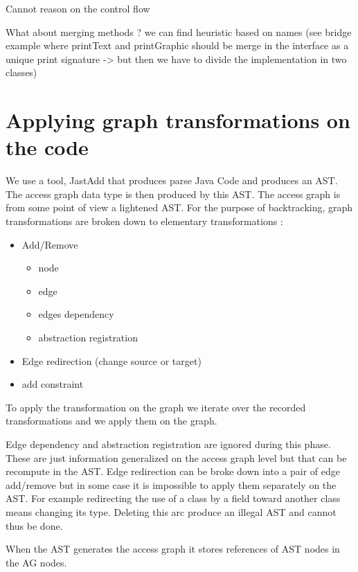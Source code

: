 \documentclass[]{article}
\begin{document}
Cannot reason on the control flow 

What about merging methods ?  we can find heuristic based on names (see bridge example where printText and printGraphic should be merge in the interface as a unique print signature -> but then we have to divide the implementation in two classes)


\section{Applying graph transformations on the code}
We use a tool, JastAdd that produces parse Java Code and produces an AST. The access graph data type is then produced by this AST. The access graph is from some point of view a lightened AST.
For the purpose of backtracking, graph transformations are broken down to elementary transformations : 
\begin{itemize}
\item Add/Remove
	\begin{itemize}
	\item node
	\item edge
	\item edges dependency 
	\item abstraction registration
	\end{itemize}
\item Edge redirection (change source or target)
\item add constraint	
\end{itemize}

To apply the transformation on the graph we iterate over the recorded transformations and we apply them on the graph.

Edge dependency and abstraction registration are ignored during this phase. These are just information generalized on the access graph level but that can be recompute in the AST.
Edge redirection can be broke down into a pair of edge add/remove but in some case it is impossible to apply them separately on the AST. For example redirecting the use of a class by a field toward another class means changing its type. Deleting this arc produce an illegal AST and cannot thus be done.

When the AST generates the access graph it stores references of AST nodes in the AG nodes.



\end{document}
